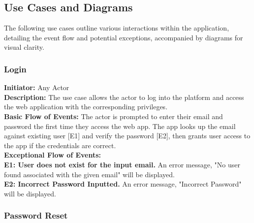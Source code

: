 \documentclass[11pt, a4paper]{article}
\begin{document}
\subsection{Use Cases and Diagrams}
The following use cases outline various interactions within the application, detailing the event flow and potential exceptions, accompanied by diagrams for visual clarity.

\subsubsection{Login}

\begin{figure}[H]
    \centering
    
\end{figure}

\textbf{Initiator: }Any Actor\\
\textbf{Description: }The use case allows the actor to log into the platform and access the web application with the corresponding privileges.\\
\textbf{Basic Flow of Events: }The actor is prompted to enter their email and password the first time they access the web app. The app looks up the email against existing user [E1] and verify the password [E2], then grants user access to the app if the credentials are correct.\\
\textbf{Exceptional Flow of Events:}\\
\textbf{E1: User does not exist for the input email. }An error message, "No user found associated with the given email" will be displayed.\\
\textbf{E2: Incorrect Password Inputted.} An error message, "Incorrect Password" will be displayed.


\subsubsection{Password Reset}

\begin{figure}[H]
    \centering
    
\end{figure}
\end{document}
